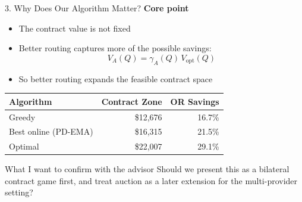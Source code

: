 \documentclass[aspectratio=169,10pt]{beamer}
\begin{document}
\begin{frame}{3. Why Does Our Algorithm Matter?}
\textbf{Core point}
\begin{itemize}
    \item The contract value is not fixed
    \item Better routing captures more of the possible savings:
    \[
    V_A(Q)=\gamma_A(Q)\,V_{\mathrm{opt}}(Q)
    \]
    \item So better routing expands the feasible contract space
\end{itemize}

\vspace{0.1cm}
\centering
\begin{tabular}{lrr}
\toprule
Algorithm & Contract Zone & OR Savings \\
\midrule
Greedy & \$12,676 & 16.7\% \\
Best online (PD-EMA) & \$16,315 & 21.5\% \\
Optimal & \$22,007 & 29.1\% \\
\bottomrule
\end{tabular}

\vspace{0.15cm}
\begin{block}{What I want to confirm with the advisor}
\small
Should we present this as a bilateral contract game first, and treat auction as a later extension for the multi-provider setting?
\end{block}
\end{frame}
\end{document}
